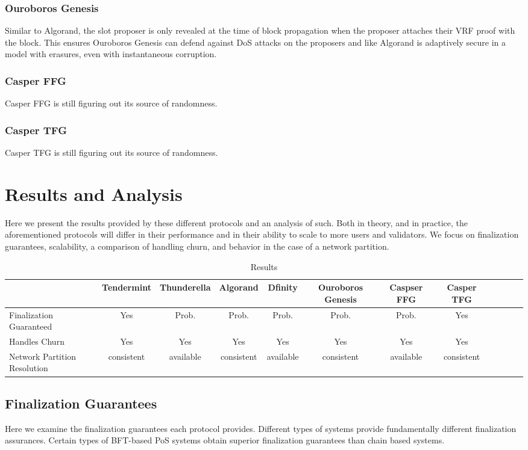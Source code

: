 \documentclass[10pt,journal,compsoc]{IEEEtran}
\begin{document}
\subsubsection{Ouroboros Genesis}
Similar to Algorand, the slot proposer is only revealed at the time of block propagation when the proposer attaches their VRF proof with the block. This ensures Ouroboros Genesis can defend against DoS attacks on the proposers and like Algorand is adaptively secure in a model with erasures, even with instantaneous corruption.
\subsubsection{Casper FFG}
Casper FFG is still figuring out its source of randomness.
\subsubsection{Casper TFG}
Casper TFG is still figuring out its source of randomness.

\section{Results and Analysis}
Here we present the results provided by these different protocols and an analysis of such. Both in theory, and in practice, the aforementioned protocols will differ in their performance and in their ability to scale to more users and validators. We focus on finalization guarantees, scalability, a comparison of handling churn, and behavior in the case of a network partition.

\begin{table*}[htdp]
 \caption{Results}
\label{}
\begin{tabularx}{\textwidth}{@{}l*{10}{C}c@{}}
\toprule
                 & Tendermint & Thunderella & Algorand & Dfinity & Ouroboros Genesis  & Caspser FFG & Casper TFG   \\ 
\midrule
Finalization Guaranteed  & Yes  & Prob. & Prob.  & Prob. & Prob.  & Prob. & Yes    \\
\addlinespace
Handles Churn  & Yes  & Yes  & Yes & Yes & Yes & Yes & Yes\\ 
\addlinespace
Network Partition Resolution  & consistent & available & consistent  & available &  consistent &  available & consistent\\ 
\bottomrule
\end{tabularx}
\end{table*}


\subsection{Finalization Guarantees}
Here we examine the finalization guarantees each protocol provides. Different types of systems provide fundamentally different finalization assurances. Certain types of BFT-based PoS systems obtain superior finalization guarantees than chain based systems. 
\end{document}
